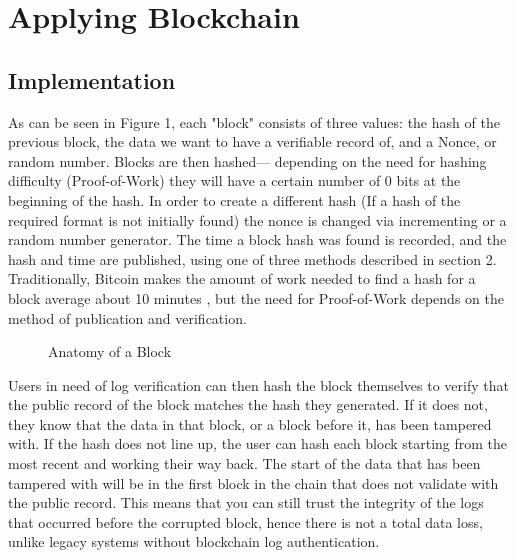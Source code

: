 \chapter{Applying Blockchain}
\section{Implementation}
As can be seen in Figure 1, each "block" consists of three values: the hash of the previous block, the data we want to have a verifiable record of, and a Nonce, or random number. Blocks are then hashed--- depending on the need for hashing difficulty (Proof-of-Work) they will have a certain number of 0 bits at the beginning of the hash. In order to create a different hash (If a hash of the required format is not initially found) the nonce is changed via incrementing or a random number generator. The time a block hash was found is recorded, and the hash and time are published, using one of three methods described in section 2. Traditionally, Bitcoin makes the amount of work needed to find a hash for a block average about 10 minutes \cite{Bitcoin}, but the need for Proof-of-Work depends on the method of publication and verification.
        
        \begin{figure}[hbt!]
        \centering
        \caption{Anatomy of a Block}
        \end{figure} %

        Users in need of log verification can then hash the block themselves to verify that the public record of the block matches the hash they generated. If it does not, they know that the data in that block, or a block before it, has been tampered with. If the hash does not line up, the user can hash each block starting from the most recent and working their way back. The start of the data that has been tampered with will be in the first block in the chain that does not validate with the public record. This means that you can still trust the integrity of the logs that occurred before the corrupted block, hence there is not a total data loss, unlike legacy systems without blockchain log authentication.
        
